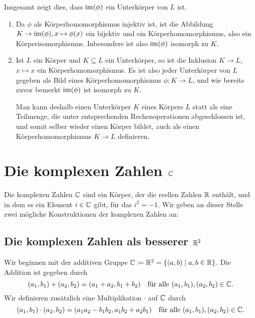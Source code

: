 Insgesamt zeigt dies, dass $\mathrm{im}(\phi)$ ein Unterkörper von $L$ ist.

\begin{bem}
 \begin{enumerate}[leftmargin=*]
  \item
   Da $\phi$ als Körperhomomorphismus injektiv ist, ist die Abbildung $K \to \mathrm{im}(\phi), x \mapsto \phi(x)$ ein bijektiv und ein Körperhomomorphismus, also ein Körperisomorphismus. Inbesondere ist also $\mathrm{im}(\phi)$ isomorph zu $K$.
  \item
   Ist $L$ ein Körper und $K \subseteq L$ ein Unterkörper, so ist die Inklusion $K \to L$, $x \mapsto x$ ein Körperhomomorphismus. Es ist also jeder Unterkörper von $L$ gegeben als Bild eines Körperhomomorphismus $\phi \colon K \to L$, und wie bereits zuvor bemerkt $\mathrm{im}(\phi)$ ist isomorph zu $K$.
   
   Man kann deshalb einen Unterkörper $K$ eines Körpers $L$ statt als eine Teilmenge, die unter entsprechenden Rechenoperationen abgeschlossen ist, und somit selber wieder einen Körper bildet, auch als einen Körperhomomorphismus $K \to L$ definieren.
 \end{enumerate}
\end{bem}





\section{Die komplexen Zahlen \texorpdfstring{$\mathbb{C}$}{C}}
Die komplexen Zahlen $\mathbb{C}$ sind ein Körper, der die reellen Zahlen $\mathbb{R}$ enthält, und in dem es ein Element $i \in \mathbb{C}$ gibt, für das $i^2 = -1$. Wir geben an dieser Stelle zwei mögliche Konstruktionen der komplexen Zahlen an:



\subsection{Die komplexen Zahlen als besserer \texorpdfstring{$\mathbb{R}^2$}{R2}}\label{subsec: C as R2}
Wir beginnen mit der additiven Gruppe $\mathbb{C} \coloneqq \mathbb{R}^2 = \{(a,b) \mid a,b \in \mathbb{R}\}$. Die Addition ist gegeben durch
\[
 (a_1, b_1) + (a_2, b_2) = (a_1 + a_2, b_1 + b_2)
 \quad\text{für alle $(a_1, b_1), (a_2, b_2) \in \mathbb{C}$}.
\]
Wir definieren zusätzlich eine Multiplikation $\cdot$ auf $\mathbb{C}$ durch
\[
 (a_1, b_1) \cdot (a_2, b_2)
 = (a_1 a_2 - b_1 b_2, a_1 b_2 + a_2 b_1)
 \quad\text{für alle $(a_1, b_1), (a_2, b_2) \in \mathbb{C}$}.
\]

